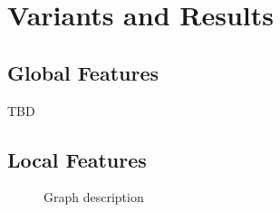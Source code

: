 \section{Variants and Results}\label{sec:results}

\subsection{Global Features}

TBD

\begin{figure}[h]
    
    \caption[canny stuff]{
    }
    \label{fig:pipeline_global_luma_mean_l2}
\end{figure}

\begin{figure}[h]
    
    \caption[canny stuff]{
    }
    \label{fig:pipeline_global_luma_canny_mean_l2}
\end{figure}

\subsection{Local Features}

\begin{figure}[h]
    \centering
    \quad
    \caption[Pipelines using canny edge detector]{
    }
    \label{fig:pipeline_local_luma_canny_pmean}
\end{figure}

\begin{figure}[h]
    
    \caption[Results for canny edge detector]{
        Graph description
    }
    \label{fig:results_local_luma_canny_pmean}
\end{figure}
